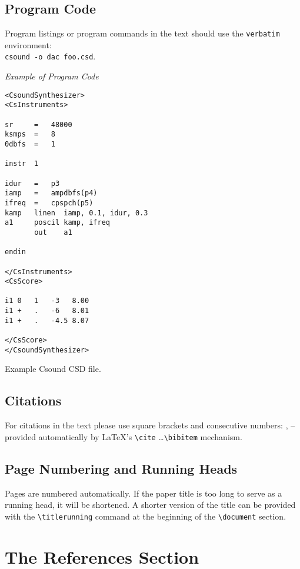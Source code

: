 \documentclass[runningheads,a4paper]{llncs}
\begin{document}
\subsection{Program Code}

Program listings or program commands in the text should use the \verb+verbatim+
environment: \\ \verb+csound -o dac foo.csd+.

\medskip

\noindent
{\it Example of Program Code}
	\begin{verbatim}
<CsoundSynthesizer>
<CsInstruments>

sr     =   48000
ksmps  =   8
0dbfs  =   1

instr  1

idur   =   p3
iamp   =   ampdbfs(p4)
ifreq  =   cpspch(p5)
kamp   linen  iamp, 0.1, idur, 0.3
a1     poscil kamp, ifreq
       out    a1

endin

</CsInstruments>
<CsScore>

i1 0   1   -3   8.00
i1 +   .   -6   8.01
i1 +   .   -4.5 8.07

</CsScore>
</CsoundSynthesizer>
	\end{verbatim}
%
\noindent
{\small Example Csound CSD file.}

\subsection{Citations}

For citations in the text please use square brackets and consecutive
numbers: \cite{jour}, \cite{proceeding} -- provided automatically
by \LaTeX 's \verb|\cite| \dots\verb|\bibitem| mechanism.

\subsection{Page Numbering and Running Heads}

Pages are numbered automatically. If the paper title is too long to serve
as a running head, it will be shortened. A shorter version of the title can
be provided with the \verb+\titlerunning+ command at the beginning of the
\verb+\document+ section.


\section{The References Section}\label{references}
\end{document}

